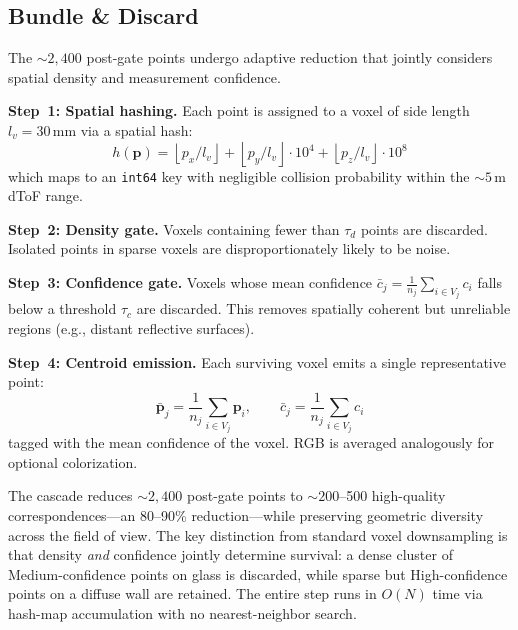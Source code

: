 \subsection{Bundle \& Discard}
\label{sec:bundle_discard}

The ${\sim}2{,}400$ post-gate points undergo adaptive reduction that jointly considers spatial density and measurement confidence.

\textbf{Step~1: Spatial hashing.}
Each point is assigned to a voxel of side length $l_v = 30$\,mm via a spatial hash:
\begin{equation}
    h(\mathbf{p}) = \left\lfloor p_x / l_v \right\rfloor
                  + \left\lfloor p_y / l_v \right\rfloor \cdot 10^4
                  + \left\lfloor p_z / l_v \right\rfloor \cdot 10^8
    \label{eq:bd_hash}
\end{equation}
which maps to an \texttt{int64} key with negligible collision probability within the ${\sim}5$\,m dToF range.

\textbf{Step~2: Density gate.}
Voxels containing fewer than $\tau_d$ points are discarded.
Isolated points in sparse voxels are disproportionately likely to be noise.

\textbf{Step~3: Confidence gate.}
Voxels whose mean confidence $\bar{c}_j = \frac{1}{n_j}\sum_{i \in V_j} c_i$ falls below a threshold $\tau_c$ are discarded.
This removes spatially coherent but unreliable regions (e.g., distant reflective surfaces).

\textbf{Step~4: Centroid emission.}
Each surviving voxel emits a single representative point:
\begin{equation}
    \bar{\mathbf{p}}_j = \frac{1}{n_j}\sum_{i \in V_j} \mathbf{p}_i, \qquad
    \bar{c}_j = \frac{1}{n_j}\sum_{i \in V_j} c_i
    \label{eq:centroid}
\end{equation}
tagged with the mean confidence of the voxel.
RGB is averaged analogously for optional colorization.

The cascade reduces ${\sim}2{,}400$ post-gate points to ${\sim}200$--500 high-quality correspondences---an 80--90\% reduction---while preserving geometric diversity across the field of view.
The key distinction from standard voxel downsampling is that density \emph{and} confidence jointly determine survival: a dense cluster of Medium-confidence points on glass is discarded, while sparse but High-confidence points on a diffuse wall are retained.
The entire step runs in $O(N)$ time via hash-map accumulation with no nearest-neighbor search.

